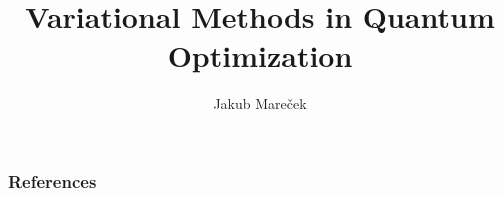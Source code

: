 \documentclass[aspectratio=149,ignorenonframetext,xcolor={dvipsnames,table}]{beamer}
\title[Variational Methods]{Variational Methods in Quantum Optimization}
\author{Jakub Mare{\v c}ek}
\institute{CTU}
\def\biblio{\tiny}
\numberwithin{equation}{\numberbychaporsect}
\numberwithin{figure}{\numberbychaporsect}
\numberwithin{table}{\numberbychaporsect}
\begin{document}
\def\biblio{See the references at the end of the deck.}
















\providecommand{\bbletal}{et al.}

\begin{frame}[allowframebreaks]\frametitle{References}
\tiny


\end{frame}
\end{document}
